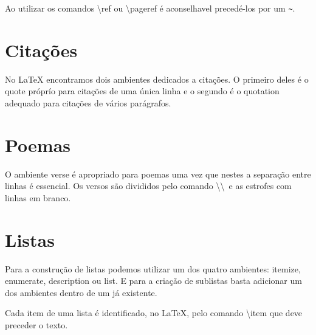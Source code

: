 Ao utilizar os comandos \textbackslash\textsf{ref} ou \textbackslash\textsf{pageref} é aconselhavel precedé-los por um \verb+~+.

\section{Citações}

No LaTeX encontramos dois ambientes dedicados a citações. O primeiro deles é o \textsf{quote} próprío para citações de uma única linha e o segundo é o \textsf{quotation} adequado para citações de vários parágrafos.

\section{Poemas}

O ambiente \textsf{verse} é apropriado para poemas uma vez que nestes a separação entre linhas é essencial. Os versos são divididos pelo comando \textbackslash\textbackslash \ e as estrofes com linhas em branco.

\section{Listas}

Para a construção de listas podemos utilizar um dos quatro ambientes: \textsf{itemize}, \textsf{enumerate}, \textsf{description} ou \textsf{list}. E para a criação de sublistas basta adicionar um dos ambientes dentro de um já existente.

Cada item de uma lista é identificado, no LaTeX, pelo comando \textbackslash\textsf{item} que deve preceder o texto.

